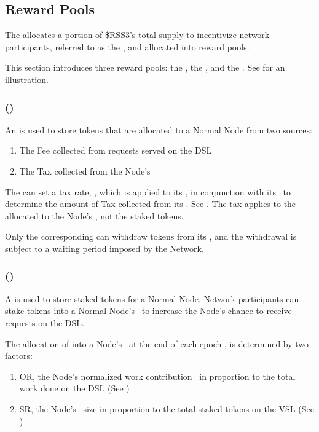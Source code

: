 \subsection{Reward Pools}
\label{subsec:reward_pools}

The  allocates a portion of \$RSS3's total supply to incentivize network participants, referred to as the ,
and allocated into reward pools.

This section introduces three reward pools: the , the , and the . See  for an illustration.

\subsubsection{ (\operationPool)}
\label{subsubsec:operation_pool}

An  is used to store tokens that are allocated to a Normal Node from two sources:
\begin{enumerate}
    \item The \gls{Fee} collected from requests served on the \gls{DSL}
    \item The \gls{Tax} collected from the Node's \stakingPool
\end{enumerate}

The  can set a tax rate, \taxRate, which is applied to its \stakingPool, in conjunction with its \deposit\ to determine the amount of \gls{Tax} collected from its \stakingPool.
See .
The tax applies to the  allocated to the Node's \stakingPool, not the staked tokens.

Only the corresponding  can withdraw tokens from its \operationPool, and the withdrawal is subject to a waiting period imposed by the Network.

\subsubsection{ (\stakingPool)}
\label{subsubsec:staking_pool}

A  is used to store staked tokens for a Normal Node. Network participants can stake tokens into a Normal Node's \stakingPool\ to increase the Node's chance to receive requests on the \gls{DSL}.

The allocation of  into a Node's \stakingPool\ at the end of each epoch \epoch, is determined by two factors:
\begin{enumerate}
    \item \gls{OR}, the Node's normalized work contribution \work\ in proportion to the total work done on the \gls{DSL} (See )
    \item \gls{SR}, the Node's \stakingPool\ size in proportion to the total staked tokens on the \gls{VSL} (See )
\end{enumerate}

